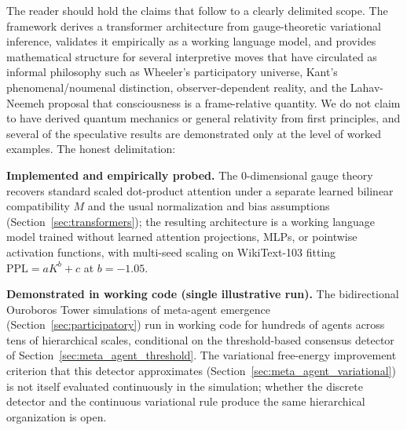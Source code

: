 \documentclass[11pt]{article}
\begin{document}
The reader should hold the claims that follow to a clearly delimited scope. The framework derives a transformer architecture from gauge-theoretic variational inference, validates it empirically as a working language model, and provides mathematical structure for several interpretive moves that have circulated as informal philosophy such as  Wheeler's participatory universe, Kant's phenomenal/noumenal distinction, observer-dependent reality, and the Lahav-Neemeh proposal that consciousness is a frame-relative quantity. We do not claim to have derived quantum mechanics or general relativity from first principles, and several of the speculative results are demonstrated only at the level of worked examples. The honest delimitation:

\textbf{Implemented and empirically probed.} The 0-dimensional gauge theory recovers standard scaled dot-product attention under a separate learned bilinear compatibility $M$ and the usual normalization and bias assumptions (Section~\ref{sec:transformers}); the resulting architecture is a working language model trained without learned attention projections, MLPs, or pointwise activation functions, with multi-seed scaling on WikiText-103 fitting $\mathrm{PPL} = aK^b + c$ at $b = -1.05$.

\textbf{Demonstrated in working code (single illustrative run).} The bidirectional Ouroboros Tower simulations of meta-agent emergence (Section~\ref{sec:participatory}) run in working code for hundreds of agents across tens of hierarchical scales, conditional on the threshold-based consensus detector of Section~\ref{sec:meta_agent_threshold}. The variational free-energy improvement criterion that this detector approximates (Section~\ref{sec:meta_agent_variational}) is not itself evaluated continuously in the simulation; whether the discrete detector and the continuous variational rule produce the same hierarchical organization is open.
\end{document}
